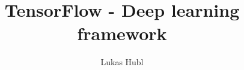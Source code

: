 \documentclass[bachelor,english]{hgbthesis}
\title{TensorFlow - Deep learning framework}
\author{Lukas Hubl}
\begin{document}

\frontmatter							%

\maketitle
\tableofcontents


%

\mainmatter          			%













\appendix                                         %


\MakeBibliography                        				%



\end{document}
